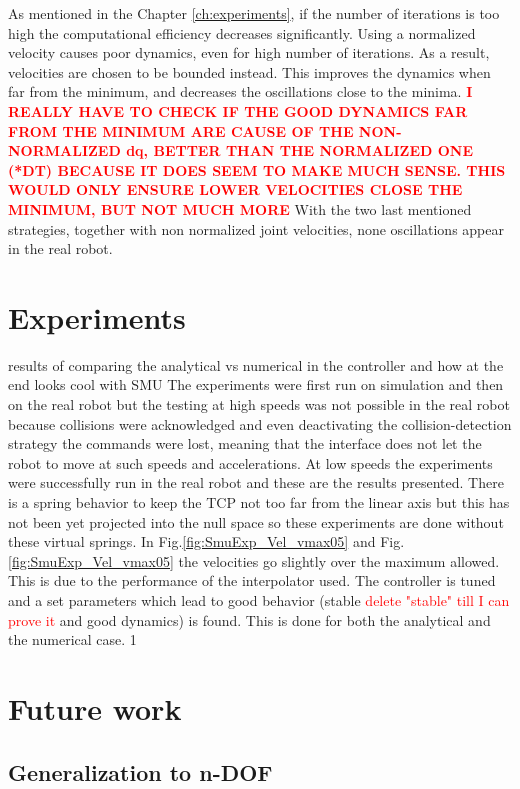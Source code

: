 {%
As mentioned in the Chapter \ref{ch:experiments}, if the number of iterations is too high the computational efficiency decreases significantly. Using a normalized velocity causes poor dynamics, even for high number of iterations.
As a result, velocities are chosen to be bounded instead. This improves the dynamics when far from the minimum, and decreases the oscillations close to the minima.
%
\textcolor{red}{\textbf{I REALLY HAVE TO CHECK IF THE GOOD DYNAMICS FAR FROM THE MINIMUM ARE CAUSE OF THE NON-NORMALIZED dq, BETTER THAN THE NORMALIZED ONE (*DT) BECAUSE IT DOES SEEM TO MAKE MUCH SENSE. THIS WOULD ONLY ENSURE LOWER VELOCITIES CLOSE THE MINIMUM, BUT NOT MUCH MORE}}
%
With the two last mentioned strategies, together with non normalized joint velocities, none oscillations appear in the real robot.
%
\section{Experiments}
results of comparing the analytical vs numerical in the controller and how at the end looks cool with SMU 
%
The experiments were first run on simulation and then on the real robot but the testing at high speeds was not possible in the real robot because collisions were acknowledged and even deactivating the collision-detection strategy the commands were lost, meaning that the interface does not let the robot to  move at such speeds and accelerations. At low speeds the experiments were successfully run in the real robot and these are the results presented.
%
There is a spring behavior to keep the TCP not too far from the linear axis but this has not been yet projected into the null space so these experiments are done without these virtual springs.
%
In Fig.\ref{fig:SmuExp_Vel_vmax05} and Fig.\ref{fig:SmuExp_Vel_vmax05} the velocities go slightly over the maximum allowed. This is due to the performance of the interpolator used.
%
The controller is tuned and a set parameters which lead to good behavior (stable\textcolor{red}{ delete "stable" till I can prove it} and good dynamics) is found. This is done for both the analytical and the numerical case. 
1}
\section{Future work}
\label{sec:future_work}

\subsection{Generalization to n-DOF}
\label{subsec:extension_ndof}

